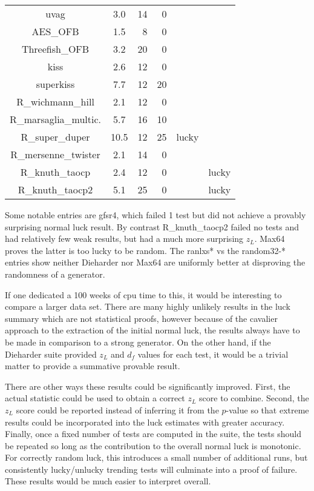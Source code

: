 \begin{table}
\begin{tabular}{|c|S[table-format=2.1]|r|r|c|c|}
uvag & 3.0 & 14 & 0 & & \\
AES\_OFB & 1.5 & 8 & 0 &  & \\
Threefish\_OFB & 3.2 & 20 & 0 & & \\
kiss & 2.6 & 12 & 0 &  & \\
superkiss & 7.7 & 12 & 20 & & \\
R\_wichmann\_hill & 2.1 & 12 & 0 &  & \\
R\_marsaglia\_multic. & 5.7 & 16 & 10 & & \\
R\_super\_duper & 10.5 & 12 & 25 & lucky & \\
R\_mersenne\_twister & 2.1 & 14 & 0 &  & \\
R\_knuth\_taocp & 2.4 & 12 & 0 &  & lucky \\
R\_knuth\_taocp2 & 5.1 & 25 & 0 & & lucky \\
\hline
\end{tabular}
\end{table}
Some notable entries are gfsr4, which failed 1 test but did not achieve a provably surprising normal luck result.  By contrast R\_knuth\_taocp2 failed no tests and had relatively few weak results, but had a much more surprising $z_L$.  Max64 proves the latter is too lucky to be random.  The ranlxs* vs the random32-* entries show neither Dieharder nor Max64 are uniformly better at disproving the randomness of a generator.

If one dedicated a 100 weeks of cpu time to this, it would be interesting to compare a larger data set.  There are many highly unlikely results in the luck summary which are not statistical proofs, however because of the cavalier approach to the extraction of the initial normal luck, the results always have to be made in comparison to a strong generator.  On the other hand, if the Dieharder suite provided $z_L$ and $d_f$ values for each test, it would be a trivial matter to provide a summative provable result.

There are other ways these results could be significantly improved.  First, the actual statistic could be used to obtain a correct $z_L$ score to combine.  Second, the $z_L$ score could be reported instead of inferring it from the $p$-value so that extreme results could be incorporated into the luck estimates with greater accuracy.  Finally, once a fixed number of tests are computed in the suite, the tests should be repeated so long as the contribution to the overall normal luck is monotonic.  For correctly random luck, this introduces a small number of additional runs, but consistently lucky/unlucky trending tests will culminate into a proof of failure.  These results would be much easier to interpret overall.


